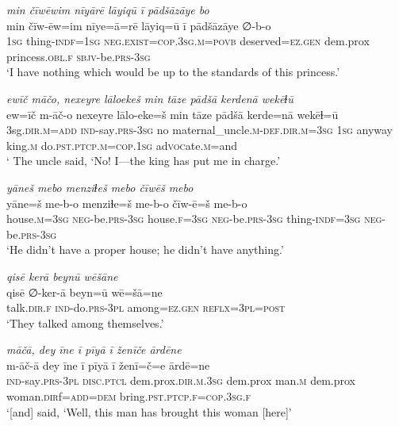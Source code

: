 \ea \label{ZP.105}
\textit{min čīwēwim nīyārē lāyiqū ī pādšāzāye bo} \\ 
\gll min čīw-ēw=im nīye=ā=rē lāyiq=ū ī pādšāzāye ∅-b-o \\ 
 \textsc{1sg} thing\textsc{-indf}\textsc{=\textsc{1sg}} \textsc{\textsc{neg.}exist}\textsc{=cop}\textsc{.3sg}\textsc{.m}\textsc{=\textsc{povb}} deserved\textsc{\textsc{=ez.gen}} dem.prox princess\textsc{.obl}\textsc{.f} \textsc{sbjv-}be\textsc{.prs}\textsc{-3sg} \\ 
\glt `I have nothing which would be up to the standards of this princess.'
\z 
 
\ea \label{ZP.107}
\textit{ewīč māčo, nexeyre lāloekeš min tāze pādšā kerdenā wekēɫū} \\ 
\gll ew=īč m-āč-o nexeyre lālo-eke=š min tāze pādšā kerde=nā wekēɫ=ū \\ 
 3sg\textsc{.dir}\textsc{.m}\textsc{=add} \textsc{ind-}say\textsc{.prs}\textsc{-3sg} no maternal\_uncle\textsc{.m}\textsc{-def}\textsc{.dir}\textsc{.m}\textsc{=3sg} \textsc{1sg} anyway king\textsc{.m} do\textsc{.pst}\textsc{.ptcp}\textsc{.m}\textsc{=cop}\textsc{.\textsc{1sg}} ad\textsc{voc}ate\textsc{.m}=and \\ 
\glt ` The uncle said, ‘No! I—the king has put me in charge.'
\z 
 
\ea \label{ZP.112}
\textit{yāneš mebo menziɫeš mebo čīwēš mebo} \\ 
\gll yāne=š me-b-o menziɫe=š me-b-o čīw-ē=š me-b-o \\ 
 house\textsc{.m}\textsc{=3sg} \textsc{neg-}be\textsc{.prs}\textsc{-3sg} house\textsc{.f}\textsc{=3sg} \textsc{neg-}be\textsc{.prs}\textsc{-3sg} thing\textsc{-indf}\textsc{=3sg} \textsc{neg-}be\textsc{.prs}\textsc{-3sg} \\ 
\glt `He didn’t have a proper house; he didn’t have anything.'
\z 
 
\ea \label{ZP.114}
\textit{qisē kerā beynū wēšāne} \\ 
\gll qisē ∅-ker-ā beyn=ū wē=šā=ne \\ 
 talk\textsc{.dir}\textsc{.f} \textsc{ind-}do\textsc{.prs}\textsc{-3pl} among\textsc{\textsc{=ez.gen}} \textsc{reflx}\textsc{=3pl}\textsc{=\textsc{post}} \\ 
\glt `They talked among themselves.'
\z 
 
\ea \label{ZP.115}
\textit{māčā, dey īne ī pīyā ī ženīče ārdēne} \\ 
\gll m-āč-ā dey īne ī pīyā ī ženī=č=e ārdē=ne \\ 
 \textsc{ind-}say\textsc{.prs}\textsc{-3pl} \textsc{disc.ptcl} dem.prox\textsc{.dir}\textsc{.m}\textsc{.3sg} dem.prox man\textsc{.m} dem.prox woman\textsc{.dir}f\textsc{=add}\textsc{=dem} bring\textsc{.pst}\textsc{.ptcp}\textsc{.f}\textsc{=cop}\textsc{.3sg}\textsc{.f} \\ 
\glt `[and] said, ‘Well, this man has brought this woman [here]'
\z 
 
